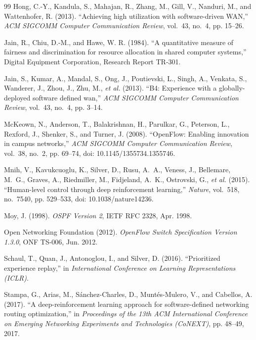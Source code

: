\documentclass[12pt,a4paper,oneside]{report}
\begin{document}
\begin{thebibliography}{99}
Hong, C.-Y., Kandula, S., Mahajan, R., Zhang, M., Gill, V., Nanduri, M., and Wattenhofer, R. (2013). ``Achieving high utilization with software-driven WAN,'' \emph{ACM SIGCOMM Computer Communication Review}, vol.~43, no.~4, pp. 15--26.

Jain, R., Chiu, D.-M., and Hawe, W. R. (1984). ``A quantitative measure of fairness and discrimination for resource allocation in shared computer systems,'' Digital Equipment Corporation, Research Report TR-301.

Jain, S., Kumar, A., Mandal, S., Ong, J., Poutievski, L., Singh, A., Venkata, S., Wanderer, J., Zhou, J., Zhu, M., \emph{et al.} (2013). ``B4: Experience with a globally-deployed software defined wan,'' \emph{ACM SIGCOMM Computer Communication Review}, vol.~43, no.~4, pp. 3--14.

McKeown, N., Anderson, T., Balakrishnan, H., Parulkar, G., Peterson, L., Rexford, J., Shenker, S., and Turner, J. (2008). ``OpenFlow: Enabling innovation in campus networks,'' \emph{ACM SIGCOMM Computer Communication Review}, vol.~38, no.~2, pp. 69--74, doi: 10.1145/1355734.1355746.

Mnih, V., Kavukcuoglu, K., Silver, D., Rusu, A.~A., Veness, J., Bellemare, M.~G., Graves, A., Riedmiller, M., Fidjeland, A.~K., Ostrovski, G., \emph{et al.} (2015). ``Human-level control through deep reinforcement learning,'' \emph{Nature}, vol.~518, no.~7540, pp. 529--533, doi: 10.1038/nature14236.

Moy, J. (1998). \emph{{OSPF Version 2}}, IETF RFC 2328, Apr. 1998.

{Open Networking Foundation} (2012). \emph{{OpenFlow Switch Specification Version 1.3.0}}, ONF TS-006, Jun. 2012.

Schaul, T., Quan, J., Antonoglou, I., and Silver, D. (2016). ``Prioritized experience replay,'' in \emph{International Conference on Learning Representations (ICLR)}.

Stampa, G., Arias, M., S\'{a}nchez-Charles, D., Munt\'{e}s-Mulero, V., and Cabellos, A. (2017). ``A deep-reinforcement learning approach for software-defined networking routing optimization,'' in \emph{Proceedings of the 13th ACM International Conference on Emerging Networking Experiments and Technologies (CoNEXT)}, pp. 48--49, 2017.


\end{thebibliography}
\end{document}
